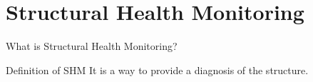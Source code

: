 \section{Structural Health Monitoring}

\begin{frame}{What is Structural Health Monitoring?} \pause

\begin{block}{Definition of SHM}
    It is a way to provide a diagnosis of the structure.
\end{block} \pause


    
\end{frame}